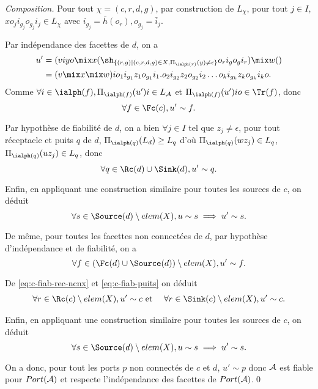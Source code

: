 \begin{proof}[Composition]
    Pour tout $\chi =(c,r,d,g)$, par construction de $L_\chi$, pour
    tout $j\in I$, $x o_j i_{g_j}  o_{g_j} i_j \in L_\chi$ avec
    $i_{g_j}= \bar{h}(o_r),o_{g_j}=\bar{i}_j$. 

    Par ind\'ependance des facettes de $d$, on a
    \begin{align*}
        u' &= (viyo \mix x(\sh_{\{(r,g) \mid (c,r,d,g) \in
          X,\Pi_{\ialph(r)}(y)\neq \epsilon\}} o_r i_g o_g i_r) \mix
        w() \\
        &=(v \mix x  \mix w)i o_1 i_{g_1} z_1 o_{g_1} i_1 . o_2 i_{g_2} z_2
        o_{g_2} i_2  \dots o_k i_{g_k} z_k
        o_{g_k} i_k o.
    \end{align*}
    Comme $\forall i \in \ialph(f), \Pi_{\ialph(f)}(u')i \in L_{\cal
      A}$  et $\Pi_{\ialph(f)}(u')io \in \Tr(f)$, donc  
    $$
    \forall f\in \Fc(c), u' \sim f.
    $$ 
  
  Par hypoth\`ese de fiabilit\'e de $d$, on a bien $\forall j\in I$
  tel que $z_j\neq \epsilon$, pour tout r\'eceptacle et puits $q$
  de $d$, $\Pi_{\ialph(q)}(L_d) \geq L_q$ d'o\`u $\Pi_{\ialph(q)}(w
  z_j) \in L_q$, $\Pi_{\ialph(q)}(u z_j) \in L_q$,  donc  
  $$
  \forall q\in \Rc(d)\cup \Sink(d), u' \sim q.
  $$  
  
  Enfin, en appliquant une construction similaire pour toutes les
  sources de $c$, on d\'eduit 
  $$
  \forall s\in \Source(d)\setminus elem(X), u\sim s \implies u' \sim s.
  $$  

  De m\^eme, pour toutes les facettes non connect\'ees de $d$, par
  hypoth\`ese d'ind\'ependance et de fiabilit\'e, on a 
  $$
  \forall f\in (\Fc(d)\cup \Source(d))\setminus elem(X), u' \sim f.
  $$  

  De \eqref{eq:c-fiab-rec-ncnx} et \eqref{eq:c-fiab-puits} on d\'eduit 
  \begin{align*}
      \forall r\in \Rc(c)\setminus elem(X), u'\sim c&\mbox{~et~}& \forall r\in
      \Sink(c)\setminus elem(X), u'\sim c.
  \end{align*}

  Enfin, en appliquant une construction similaire pour toutes les
  sources de $c$, on d\'eduit 
  $$
  \forall s\in \Source(d)\setminus elem(X), u\sim s \implies u' \sim s.
  $$  
  
  On a donc, pour tout les ports $p$ non connect\'es  de $c$ et $d$,
  $u'\sim p$ donc ${\cal A}$ est fiable pour $Port({\cal A})$ et
  respecte l'ind\'ependance des facettes de $Port({\cal A})$.\hfill\qed
\end{proof}


